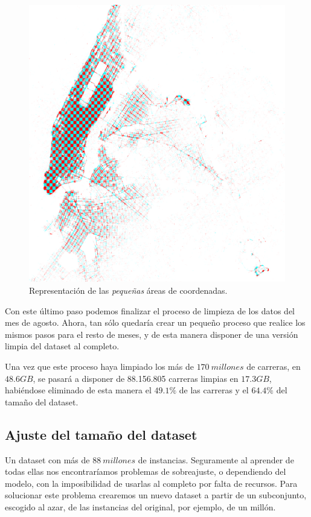 \begin{figure}[H]
  \centering
  \includegraphics[width=140mm]{figures/ch_05/map_3.png}
  \caption{Representación de las \emph{pequeñas} áreas de coordenadas.}
  \label{fig:5.11}
\end{figure}

Con este último paso podemos finalizar el proceso de limpieza de los datos del mes de agosto. Ahora, tan sólo quedaría crear un pequeño proceso que realice los mismos pasos para el resto de meses, y de esta manera disponer de una versión limpia del dataset al completo.

Una vez que este proceso haya limpiado los más de $170\:millones$ de carreras, en $48.6GB$, se pasará a disponer de 88.156.805 carreras limpias en $17.3GB$, habiéndose eliminado de esta manera el $49.1\%$ de las carreras y el $64.4\%$ del tamaño del dataset.

\subsection{Ajuste del tamaño del dataset} \label{subsec:5.2.3}

Un dataset con más de $88\:millones$ de instancias. Seguramente al aprender de todas ellas nos encontraríamos problemas de sobreajuste, o dependiendo del modelo, con la imposibilidad de usarlas al completo por falta de recursos. Para solucionar este problema crearemos un nuevo dataset a partir de un subconjunto, escogido al azar, de las instancias del original, por ejemplo, de un millón.

